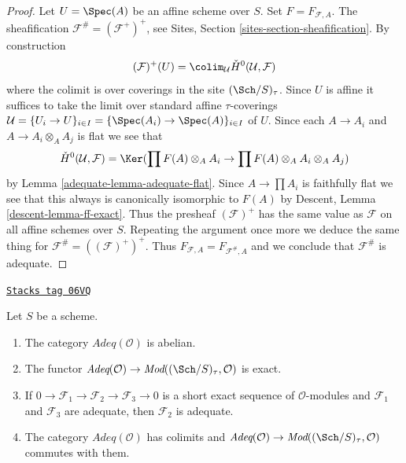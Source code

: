 \begin{proof}

Let $U = \Spec(A)$ be an affine scheme over $S$.
Set $F = F_{\mathcal{F}, A}$.
The sheafification $\mathcal{F}^\# = (\mathcal{F}^+)^+$, see
Sites, Section \ref{sites-section-sheafification}.
By construction
$$
(\mathcal{F})^+(U) =
\colim_\mathcal{U} \check{H}^0(\mathcal{U}, \mathcal{F})
$$
where the colimit is over coverings in the site $(\Sch/S)_\tau$.
Since $U$ is affine it suffices to take the limit over standard
affine $\tau$-coverings
$\mathcal{U} = \{U_i \to U\}_{i \in I} =
\{\Spec(A_i) \to \Spec(A)\}_{i \in I}$ of $U$.
Since each $A \to A_i$ and $A \to A_i \otimes_A A_j$ is flat we see that
$$
\check{H}^0(\mathcal{U}, \mathcal{F}) =
\Ker(\prod F(A) \otimes_A A_i \to \prod F(A) \otimes_A A_i \otimes_A A_j)
$$
by
Lemma \ref{adequate-lemma-adequate-flat}.
Since $A \to \prod A_i$ is faithfully flat we see that this always
is canonically isomorphic to $F(A)$ by
Descent, Lemma \ref{descent-lemma-ff-exact}.
Thus the presheaf $(\mathcal{F})^+$ has the same value as
$\mathcal{F}$ on all affine schemes over $S$. Repeating the argument
once more we deduce the same thing for $\mathcal{F}^\# = ((\mathcal{F})^+)^+$.
Thus $F_{\mathcal{F}, A} = F_{\mathcal{F}^\#, A}$ and we conclude
that $\mathcal{F}^\#$ is adequate.
\end{proof}

\begin{lemma}
\label{adequate-lemma-abelian-adequate}
\href{https://stacks.math.columbia.edu/tag/06VQ}{\texttt{Stacks tag 06VQ}}

Let $S$ be a scheme.
\begin{enumerate}
\item The category $\textit{Adeq}(\mathcal{O})$ is abelian.
\item The functor
$\textit{Adeq}(\mathcal{O}) \to
\textit{Mod}((\Sch/S)_\tau, \mathcal{O})$
is exact.
\item If $0 \to \mathcal{F}_1 \to \mathcal{F}_2 \to \mathcal{F}_3 \to 0$
is a short exact sequence of $\mathcal{O}$-modules and
$\mathcal{F}_1$ and $\mathcal{F}_3$ are adequate, then
$\mathcal{F}_2$ is adequate.
\item The category $\textit{Adeq}(\mathcal{O})$ has colimits and
$\textit{Adeq}(\mathcal{O}) \to
\textit{Mod}((\Sch/S)_\tau, \mathcal{O})$
commutes with them.
\end{enumerate}
\end{lemma}

